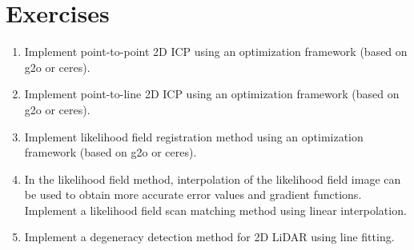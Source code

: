 \section*{Exercises}
\begin{enumerate}
	\item Implement point-to-point 2D ICP using an optimization framework (based on g2o or ceres).
	\item Implement point-to-line 2D ICP using an optimization framework (based on g2o or ceres).
	\item Implement likelihood field registration method using an optimization framework (based on g2o or ceres).
	\item In the likelihood field method, interpolation of the likelihood field image can be used to obtain more accurate error values and gradient functions. Implement a likelihood field scan matching method using linear interpolation.
	\item Implement a degeneracy detection method for 2D LiDAR using line fitting.
\end{enumerate}
